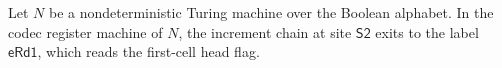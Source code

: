 \begin{lemma}
\label{Complexity.Codec.icNext_S2}
\leanok
{}
Let $N$ be a nondeterministic Turing machine over the Boolean alphabet. In the codec
register machine of $N$, the increment chain at site $\mathsf{S2}$ exits to the label
$\mathsf{eRd1}$, which reads the first-cell head flag.
\end{lemma}
